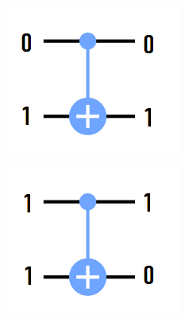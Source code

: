 \documentclass[11pt]{article}
\begin{document}
\begin{figure}[H]
    \includegraphics[scale=1]{cnot_example_1}
    \centering
\end{figure}

\begin{figure}[H]
    \includegraphics[scale=1]{cnot_example_2}
    \centering
\end{figure}
\end{document}
